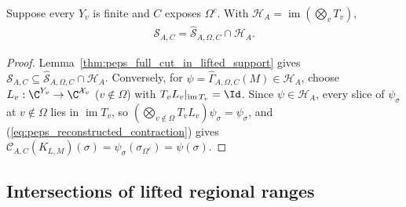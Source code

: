 \begin{lemma}%
    \label{thm:peps_lifted_cut_reconstruction}
    \leanok
    Suppose every $Y_v$ is finite and $C$ exposes $\Omega^c$. With
    $\mathcal H_A=\operatorname{im}(\bigotimes_vT_v)$,
    \begin{align}
        \mathcal S_{A,C}
        =\widehat{\mathcal S}_{A,\Omega,C}\cap\mathcal H_A.
        \label{eq:peps_lifted_reconstruction}
    \end{align}
\end{lemma}
\begin{proof}\leanok
    Lemma~\ref{thm:peps_full_cut_in_lifted_support} gives
    $\mathcal S_{A,C}\subseteq\widehat{\mathcal S}_{A,\Omega,C}\cap\mathcal H_A$.
    Conversely, for $\psi=\widehat\Gamma_{A,\Omega,C}(M)\in\mathcal H_A$,
    choose $L_v:\C^{Y_v}\to\C^{\mathcal X_v}$ ($v\notin\Omega$) with
    $T_vL_v|_{\operatorname{im}T_v}=\Id$. Since $\psi\in\mathcal H_A$, every
    slice of $\psi_\sigma$ at $v\notin\Omega$ lies in $\operatorname{im}T_v$, so
    $(\bigotimes_{v\notin\Omega}T_vL_v)\psi_\sigma=\psi_\sigma$, and
    (\ref{eq:peps_reconstructed_contraction}) gives
    $\mathcal C_{A,C}(K_{L,M})(\sigma)=\psi_\sigma(\sigma_{\Omega^c})=\psi(\sigma)$.
\end{proof}

\subsection{Intersections of lifted regional ranges}
\label{sec:peps_lifted_cut_intersection}

